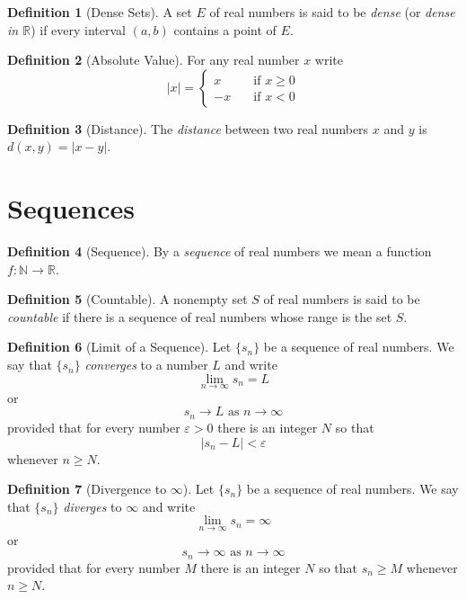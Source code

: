 \documentclass[11pt]{article}
\def \R {\mathbb{R}}
\def \N {\mathbb{N}}
\def \epsilon {\varepsilon}
\newcommand{\set}[1]{\{#1\}}
\def \limittoinfyn {\lim_{n \to \infty}}
\def \sn {s_n}
\def \seqsn{ \set{\sn} }
\theoremstyle{definition}
\newtheorem{definition}{Definition}[section]
\begin{document}
\setcounter{definition}{13}
\begin{definition} [Dense Sets]
	A set $ E $ of real numbers is said to be \textit{dense} (or \textit{dense in $\R$}) if every interval $ (a, b) $ contains a point of $ E $.
\end{definition}

\setcounter{definition}{15}
\begin{definition} [Absolute Value]
	For any real number $ x $ write	
	\[ |x| =
	\begin{cases}
		x & \quad \text{if } x \geq 0 \\
		-x & \quad \text{if } x < 0
	\end{cases}
	\]
\end{definition}

\setcounter{definition}{17}
\begin{definition} [Distance]
	The \textit{distance} between two real numbers $ x $ and $ y $ is $d(x, y) = |x - y|$.
\end{definition}

\section{Sequences}

\begin{definition} [Sequence]
	By a \textit{sequence} of real numbers we mean a function $ f : \N \rightarrow \R $.
\end{definition}

\setcounter{definition}{4}
\begin{definition} [Countable]
	A nonempty set $ S $ of real numbers is said to be \textit{countable} if there is a sequence of real numbers whose range is the set $ S $.
\end{definition}


\begin{definition} [Limit of a Sequence]
	Let $ \seqsn $ be a sequence of real numbers. We say that $ \seqsn $	\textit{converges} to a number $ L $ and write $$ \limittoinfyn \sn = L $$
	or
	$$\sn \rightarrow  L \text{ as } n \rightarrow \infty$$
	provided that for every number $ \epsilon > 0 $ there is an integer $ N $ so that $$ |\sn - L| < \epsilon $$ whenever $ n \geq N $.
\end{definition}

\setcounter{definition}{8}
\begin{definition} [Divergence to $\infty$]
	Let $ \seqsn $ be a sequence of real numbers. We say that $ \seqsn $ \textit{diverges} to $ \infty $ and write
	$$ \limittoinfyn \sn = \infty $$ or	$$ \sn \rightarrow \infty \text{ as } n \rightarrow \infty $$	provided that for every number $ M $ there is an integer $ N $ so that $ \sn \geq M $
	whenever $ n \geq N $.
\end{definition}
\end{document}
